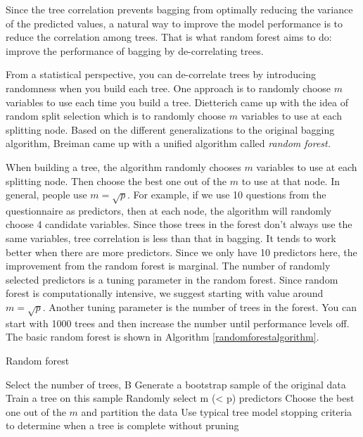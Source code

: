 \documentclass[
  12pt,
]{krantz}
\begin{document}
Since the tree correlation prevents bagging from optimally reducing the variance of the predicted values, a natural way to improve the model performance is to reduce the correlation among trees. That is what random forest aims to do: improve the performance of bagging by de-correlating trees.

From a statistical perspective, you can de-correlate trees by introducing randomness when you build each tree. One approach \citep{Ho1998, amit1997} is to randomly choose \(m\) variables to use each time you build a tree. Dietterich \citep{Dietterich2000} came up with the idea of random split selection which is to randomly choose \(m\) variables to use at each splitting node. Based on the different generalizations to the original bagging algorithm, Breiman \citep{Breiman2001} came up with a unified algorithm called \emph{random forest.}

When building a tree, the algorithm randomly chooses \(m\) variables to use at each splitting node. Then choose the best one out of the \(m\) to use at that node. In general, people use \(m=\sqrt{p}\). For example, if we use 10 questions from the questionnaire as predictors, then at each node, the algorithm will randomly choose 4 candidate variables. Since those trees in the forest don't always use the same variables, tree correlation is less than that in bagging. It tends to work better when there are more predictors. Since we only have 10 predictors here, the improvement from the random forest is marginal. The number of randomly selected predictors is a tuning parameter in the random forest. Since random forest is computationally intensive, we suggest starting with value around \(m=\sqrt{p}\). Another tuning parameter is the number of trees in the forest. You can start with 1000 trees and then increase the number until performance levels off. The basic random forest is shown in Algorithm \ref{randomforestalgorithm}.

\begin{algorithm}
\caption{Random forest}\label{randomforestalgorithm} 
\begin{algorithmic}[1] 
\State Select the number of trees, B
        \State Generate a bootstrap sample of the original data
        \State Train a tree on this sample
                \State Randomly select m (< p) predictors
                \State Choose the best one out of the $m$ and partition the data
            \EndFor
        \State Use typical tree model stopping criteria to determine when a tree is complete without pruning
    \EndFor
\end{algorithmic}
\end{algorithm}
\end{document}
